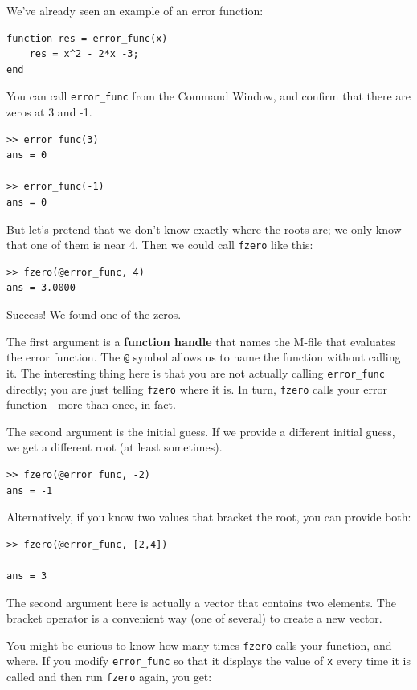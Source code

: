 \documentclass{book}
\begin{document}
We've already seen an example of an error function:

\begin{verbatim}
function res = error_func(x)
    res = x^2 - 2*x -3;
end
\end{verbatim}

You can call {\tt error\_func} from the Command Window, and
confirm that there are zeros at 3 and -1.

\begin{verbatim}
>> error_func(3)
ans = 0

>> error_func(-1)
ans = 0
\end{verbatim}

But let's pretend that we don't know exactly where
the roots are; we only know that one of them is near 4.  Then
we could call {\tt fzero} like this:

\begin{verbatim}
>> fzero(@error_func, 4)
ans = 3.0000
\end{verbatim}

Success!  We found one of the zeros.

The first argument is a
{\bf function handle} that names the M-file that evaluates
the error function.  The {\tt @} symbol allows us to name the
function without calling it.  The interesting thing here is
that you are not actually calling {\tt error\_func} directly;
you are just telling {\tt fzero} where it is.  In turn, {\tt fzero}
calls your error function---more than once, in fact.

The second argument is the initial guess.  If we provide a different
initial guess, we get a different root (at least sometimes).

\begin{verbatim}
>> fzero(@error_func, -2)
ans = -1
\end{verbatim}

Alternatively, if you know two values that bracket the root,
you can provide both:

\begin{verbatim}
>> fzero(@error_func, [2,4])

ans = 3
\end{verbatim}

The second argument here is actually a vector that contains two
elements.  The bracket operator is a convenient way (one of several)
to create a new vector.

You might be curious to know how many times {\tt fzero} calls your
function, and where.  If you modify {\tt error\_func} so that it displays
the value of {\tt x} every time it is called and then run {\tt fzero}
again, you get:
\end{document}
